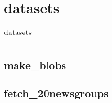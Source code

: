 \chapter{datasets\label{datasets}}
\begin{table}
    \centering
    \caption{datasets}
    \begin{tabular}{ll}
        \hline
        \nameref{makeblobs} & \nameref{fetch20newsgroups} \\
        \hline
    \end{tabular}
\end{table}
\section{make\_blobs\label{makeblobs}}
\section{fetch\_20newsgroups\label{fetch20newsgroups}}